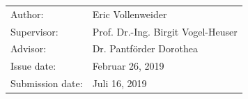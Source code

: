 \begin{titlepage}
	\vspace*{\fill}
	
	\normalsize
	\begin{flushleft}
		\begin{tabular}{l l}
			Author:					& Eric Vollenweider				\\[-0.1cm]
			Supervisor:     		& Prof. Dr.-Ing. Birgit Vogel-Heuser\\[-0.1cm]
			Advisor:				& Dr. Pantförder Dorothea\\[-0.1cm]
			Issue date:        		& {Februar 26, 2019} \\[-0.1cm]
			Submission date:        & {Juli 16, 2019} \\[-0.1cm]
		\end{tabular}
	\end{flushleft}
\end{titlepage}	